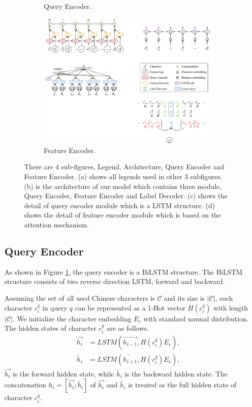 \begin{figure}
\begin{subfigure}[b]{1\columnwidth}
		\caption{Query Encoder.}
		\label{fig:21}
	\end{subfigure}
	\hfill
	\begin{subfigure}[b]{1\columnwidth}
		\centering
		\includegraphics[width=0.8\columnwidth]{figures/model-4.pdf}
		\caption{Feature Encoder.}
		\label{fig:22}
	\end{subfigure}
	\caption{There are 4 sub-figures, Legend, Architecture, Query Encoder and Feature Encoder. (a) shows all legends used in other 3 subfigures. (b) is the architecture of our model which contains three module, Query Encoder, Feature Encoder and Label Decoder. (c) shows the detail of query encoder module which is a LSTM structure. (d) shows the detail of feature encoder module which is based on the attention mechanism.}
	\label{fig:model}
\end{figure}

\subsection{Query Encoder}

As shown in Figure \ref{fig:21}, the query encoder is a BiLSTM structure. The BiLSTM structure consists of two reverse direction LSTM, forward and backward.

Assuming the set of all used Chinese characters is $\mathcal{C}$ and its size is $|\mathcal{C}|$, each character $c_i^q$ in query $q$ can be represented as a 1-Hot vector $H(c_i^q)$ with length $|\mathcal{C}|$. We initialize the character embedding $E_c$ with standard normal distribution. The hidden states of character $c_i^q$ are as follows.
\begin{align*}
	\overrightarrow{h_i} & = LSTM(\overrightarrow{h_{i-1}}, H(c_i^q) E_c),
	\\
	\overleftarrow{h_i}  & = LSTM(\overleftarrow{h_{i+1}}, H(c_i^q) E_c),
\end{align*}
$\overrightarrow{h_i}$ is the forward hidden state, while $\overleftarrow{h_i}$ is the backward hidden state. The concatenation $h_i=[\overrightarrow{h_i}; \overleftarrow{h_i}]$ of $\overrightarrow{h_i}$ and $\overleftarrow{h_i}$ is treated as the full hidden state of character $c_i^q$.



